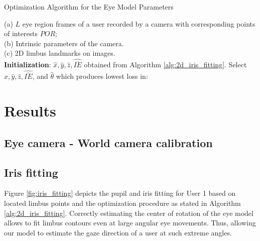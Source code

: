 \documentclass{article}
\begin{document}
\begin{algorithm}
    \caption{Optimization Algorithm for the Eye Model Parameters}
\begin{algorithmic}
    \REQUIRE (a) $L$ eye region frames of a user recorded by a camera with corresponding points of interests $POR$; \\
    \STATE (b) Intrinsic parameters of the camera.\\
    \STATE (c) 2D limbus landmarks on images.\\
    \STATE \textbf{Initialization}: $\hat{x}, \hat{y}, \hat{z}, \hat{\bar{IE}}$ obtained from Algorithm \ref{alg:2d_iris_fitting}.
    \ENDFOR
    \STATE Select $\hat{x}, \hat{y}, \hat{z}, \hat{\bar{IE}}$, and $\hat{\theta}$ which produces lowest loss in:
    
\end{algorithmic}
\label{alg:eye_param_optim}
\end{algorithm}

\section{Results}
\subsection{Eye camera - World camera calibration}

\subsection{Iris fitting}
Figure \ref{fig:iris_fitting} depicts the pupil and iris fitting for User 1 based on located limbus points and the optimization procedure as stated in Algorithm \ref{alg:2d_iris_fitting}. Correctly estimating the center of rotation of the eye model allows to fit limbus contours even at large angular eye movements.  Thus, allowing our model to estimate the gaze direction of a user at such extreme angles. 
\end{document}
